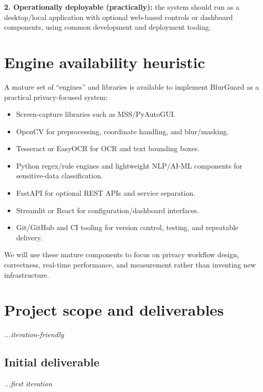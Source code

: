 \documentclass[12pt,a4paper]{article}
\begin{document}
\textbf{2. Operationally deployable (practically):} the system should run as a desktop/local application with optional web-based controls or dashboard components, using common development and deployment tooling.

\newpage


\section{Engine availability heuristic}

A mature set of ``engines'' and libraries is available to implement BlurGuard as a practical privacy-focused system:

\begin{itemize}
    \item Screen-capture libraries such as MSS/PyAutoGUI.

    \item OpenCV for preprocessing, coordinate handling, and blur/masking.

    \item Tesseract or EasyOCR for OCR and text bounding boxes.

    \item Python regex/rule engines and lightweight NLP/AI-ML components for sensitive-data classification.

    \item FastAPI for optional REST APIs and service separation.

    \item Streamlit or React for configuration/dashboard interfaces.

    \item Git/GitHub and CI tooling for version control, testing, and repeatable delivery.
\end{itemize}

We will use these mature components to focus on privacy workflow design, correctness, real-time performance, and measurement rather than inventing new infrastructure.

\section{Project scope and deliverables}
\hfill{\itshape\fontsize{8.3}{9.5}\selectfont ...iteration-friendly}

\subsection{Initial deliverable}
\hfill{\itshape\fontsize{8.3}{9.5}\selectfont ...first iteration}
\end{document}
